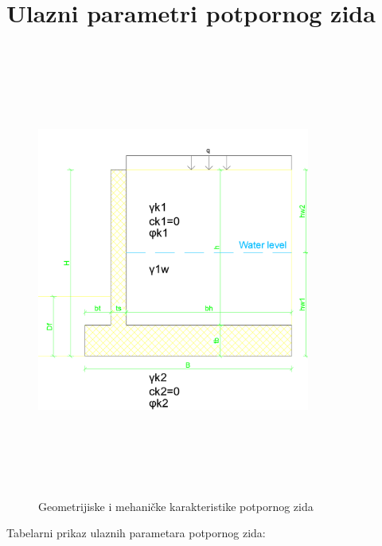 \documentclass[a4paper, 11pt]{article}
\begin{document}
\begin{titlepage}
\tableofcontents
\end{titlepage}

\section*{Ulazni parametri potpornog zida}

\vspace{3cm}

\begin{figure}[h]
    \centering
    \includegraphics[width=0.8\textwidth, height=15cm]{../Graphics/RetainingWall1_geometry.png}
    \caption{Geometrijiske i mehani\v{c}ke karakteristike potpornog zida}
    \label{geometrija_zida}
\end{figure}

\newpage

\begin{center}
Tabelarni prikaz ulaznih parametara potpornog zida:
\end{center}
\end{document}
